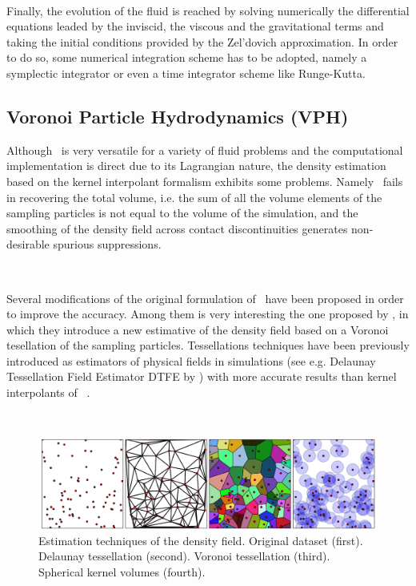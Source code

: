 \documentclass[a4,useAMS,usenatbib,usegraphicx,12pt]{article}
\begin{document}
\

Finally, the evolution of the fluid is reached by solving numerically the 
differential equations leaded by the inviscid, the viscous and the gravitational 
terms and taking the initial conditions provided by the Zel'dovich approximation. 
In order to do so, some numerical integration scheme has to be adopted, namely a 
symplectic integrator or even a time integrator scheme like Runge-Kutta.


\subsection*{Voronoi Particle Hydrodynamics (VPH)}

Although \SPH\ is very versatile for a variety of fluid problems and the
computational implementation is direct due to its Lagrangian nature, the density
estimation based on the kernel interpolant formalism exhibits some problems. 
Namely \SPH\ fails in recovering the total volume, i.e. the sum of all the 
volume elements of the sampling particles is not equal to the volume of the
simulation, and the smoothing of the density field across contact discontinuities
generates non-desirable spurious suppressions.

\

Several modifications of the original formulation of \SPH\ have been proposed in
order to improve the accuracy. Among them is very interesting the one proposed 
by \citet{Hess10}, in which they introduce a new estimative of the density field 
based on a Voronoi tesellation of the sampling particles. Tessellations 
techniques have been previously introduced as estimators of physical fields in
simulations (see e.g. Delaunay Tessellation Field Estimator DTFE by 
\citet{Schaap00}) with more accurate results than kernel interpolants of \SPH\
\citep{Pelupessy03}.

\
\begin{figure}[h]
\centering

  \includegraphics[trim = 0mm 0mm 0mm 0mm, clip, keepaspectratio=true,
  width=0.7\textheight]{./figures/Tessellations.png}
  
  \caption{\small Estimation techniques of the density field. Original 
  dataset (first). Delaunay tessellation (second). Voronoi tessellation 
  (third). Spherical kernel volumes (fourth). }

  \label{fig:Tessellations}

\end{figure}
\end{document}
